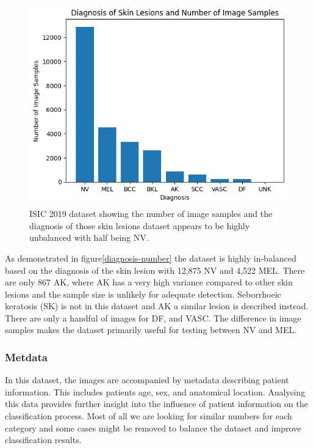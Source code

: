\begin{figure}
    \centering
    \includegraphics[scale=0.75]{images/ISIC/diagnosis-number.png}
    \caption{ISIC 2019 dataset showing the number of image samples and the diagnosis of those skin lesions dataset appears to be highly unbalanced with half being NV.} 
\end{figure}\label{diagnosis-number}
    
As demonstrated in figure\ref{diagnosis-number} the dataset is highly in-balanced based on the diagnosis of the skin lesion with 12,875 NV and 4,522 MEL. There are only 867 AK, where AK has a very high variance compared to other skin lesions and the sample size is unlikely for adequate detection. Seborrhoeic keratosis (SK) is not in this dataset and AK a similar lesion is described instead. There are only a handful of images for DF, and VASC. The difference in image samples makes the dataset primarily useful for testing between NV and MEL.

\subsubsection{Metdata}
In this dataset, the images are accompanied by metadata describing patient information. This includes patients age, sex, and anatomical location. Analysing this data provides further insight into the influence of patient information on the classification process. Most of all we are looking for similar numbers for each category and some cases might be removed to balance the dataset and improve classification results.

